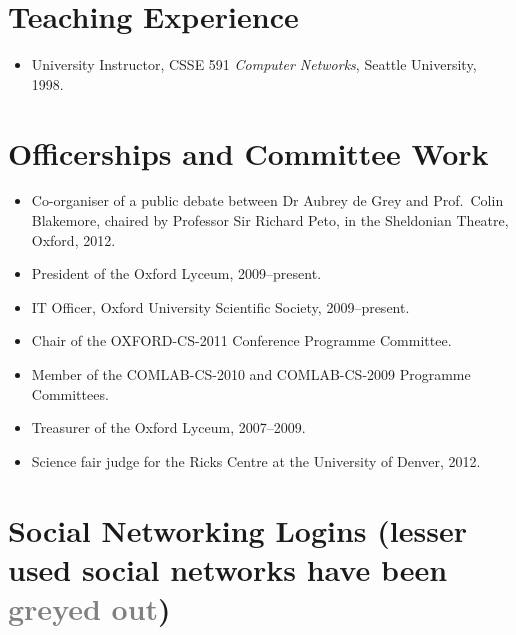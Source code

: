 \documentclass[12pt,letterpaper]{article}
\begin{document}
\vspace{-8mm}
\section*{Teaching Experience}

\begin{itemize}
    \item University Instructor, CSSE 591 \emph{Computer Networks},
    Seattle University, 1998.
\end{itemize}

\vspace{-8mm}
\section*{Officerships and Committee Work}
\begin{itemize}
	\item Co-organiser of a public debate between
		Dr Aubrey de Grey and Prof.\ Colin Blakemore, chaired by Professor Sir Richard Peto,
		in the Sheldonian Theatre, Oxford, 2012.
	\item President of the Oxford Lyceum, 2009--present.
	\item IT Officer, Oxford University Scientific Society, 2009--present.
	\item Chair of the OXFORD-CS-2011 Conference Programme Committee.
	\item Member of the COMLAB-CS-2010 and COMLAB-CS-2009 Programme Committees.
	\item Treasurer of the Oxford Lyceum, 2007--2009.
	\item Science fair judge for the Ricks Centre at the University of Denver, 2012.
\end{itemize}


\vspace{-8mm}
\section*{Social Networking Logins {\small (lesser used social networks have been
\textcolor{grey}{greyed out})}}

\end{document}

